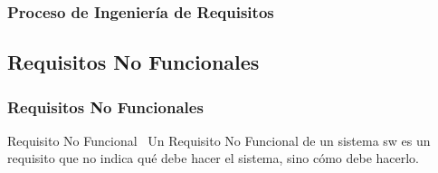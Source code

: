 \documentclass[handout,a4paper,slidestop,xcolor=pst,dvips,blue]{beamer}
\begin{document}
\begin{frame}
    \frametitle{Proceso de Ingeniería de Requisitos}
\end{frame}

\subsection{Requisitos No Funcionales}

\begin{frame}[c]
    \frametitle{Requisitos No Funcionales}
    \begin{block}{Requisito No Funcional~\cite{chung:1999}}
        Un \alert{Requisito No Funcional} de un sistema sw es un requisito que no indica qué debe hacer el sistema, sino cómo debe hacerlo.
    \end{block}
\end{frame}
\end{document}
